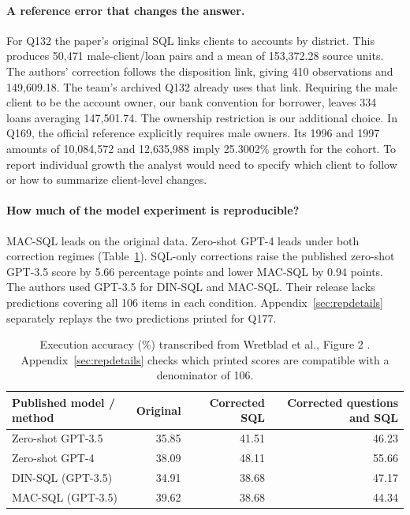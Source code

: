 \documentclass[11pt,a4paper,onecolumn,oneside]{rho-class/rho}
\begin{document}
\paragraph{A reference error that changes the answer.}
For Q132 the paper's original SQL links clients to accounts by district. This produces 50,471 male-client/loan pairs and a mean of 153,372.28 source units. The authors' correction follows the disposition link, giving 410 observations and 149,609.18. The team's archived Q132 already uses that link. Requiring the male client to be the account owner, our bank convention for borrower, leaves 334 loans averaging 147,501.74. The ownership restriction is our additional choice. In Q169, the official reference explicitly requires male owners. Its 1996 and 1997 amounts of 10,084,572 and 12,635,988 imply 25.3002\% growth for the cohort. To report individual growth the analyst would need to specify which client to follow or how to summarize client-level changes.

\paragraph{How much of the model experiment is reproducible?}
MAC-SQL leads on the original data. Zero-shot GPT-4 leads under both correction regimes (Table~\ref{tab:modelpaper}). SQL-only corrections raise the published zero-shot GPT-3.5 score by 5.66 percentage points and lower MAC-SQL by 0.94 points. The authors used GPT-3.5 for DIN-SQL and MAC-SQL. Their release lacks predictions covering all 106 items in each condition. Appendix~\ref{sec:repdetails} separately replays the two predictions printed for Q177.

\begin{table}[H]
\centering\small\renewcommand{\arraystretch}{1.16}
\begin{tabularx}{\linewidth}{@{}Xrrr@{}}
\toprule
\textbf{Published model / method} & \textbf{Original} & \textbf{Corrected SQL} & \textbf{Corrected questions and SQL}\\\midrule
Zero-shot GPT-3.5 & 35.85 & 41.51 & 46.23\\
Zero-shot GPT-4 & 38.09 & 48.11 & 55.66\\
DIN-SQL (GPT-3.5) & 34.91 & 38.68 & 47.17\\
MAC-SQL (GPT-3.5) & 39.62 & 38.68 & 44.34\\
\bottomrule
\end{tabularx}
\caption{Execution accuracy (\%) transcribed from Wretblad et al., Figure 2 \citep{wretblad}. Appendix~\ref{sec:repdetails} checks which printed scores are compatible with a denominator of 106.}\label{tab:modelpaper}
\end{table}
\end{document}

